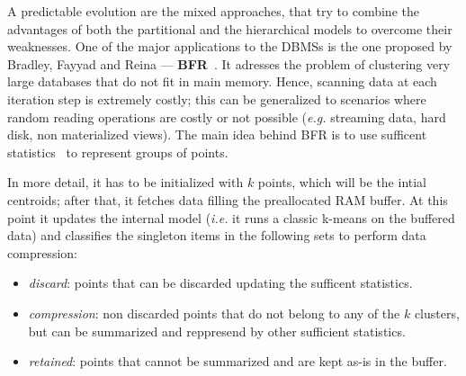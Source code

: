 A predictable evolution are the mixed approaches, that try to combine the advantages of both the partitional and the hierarchical models to overcome their weaknesses.
One of the major applications to the DBMSs is the one proposed by Bradley, Fayyad and Reina --- \textbf{BFR}~\cite{bradley1998scaling}.
It adresses the problem of clustering very large databases that do not fit in main memory.
Hence, scanning data at each iteration step is extremely costly; this can be generalized to scenarios where random reading operations are costly or not possible (\emph{e.g.} streaming data, hard disk, non materialized views).
The main idea behind BFR is to use sufficent statistics~\cite{fisher1922mathematical} to represent groups of points.

In more detail, it has to be initialized with $k$ points, which will be the intial centroids;
after that, it fetches data filling the preallocated RAM buffer.
At this point it updates the internal model (\emph{i.e.} it runs a classic k-means on the buffered data)
and classifies the singleton items in the following sets to perform data compression:
\begin{itemize}
	\item \emph{discard}: points that can be discarded updating the sufficent statistics.
	\item \emph{compression}: non discarded points that do not belong to any of the $k$ clusters,
		but can be summarized and reppresend by other sufficient statistics.
	\item \emph{retained}: points that cannot be summarized and are kept as-is in the buffer.
\end{itemize}


